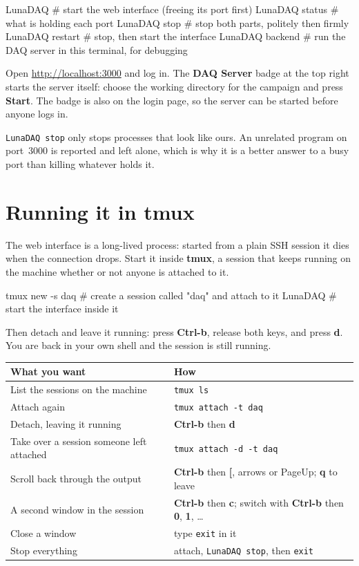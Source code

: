\documentclass[11pt,a4paper]{report}
\newcommand{\cmd}[1]{\texttt{#1}}
\newcommand{\ui}[1]{\textbf{#1}}          %
\begin{document}
\begin{shell}
LunaDAQ            # start the web interface (freeing its port first)
LunaDAQ status     # what is holding each port
LunaDAQ stop       # stop both parts, politely then firmly
LunaDAQ restart    # stop, then start the interface
LunaDAQ backend    # run the DAQ server in this terminal, for debugging
\end{shell}

Open \url{http://localhost:3000} and log in. The \ui{DAQ Server} badge at the top
right starts the server itself: choose the working directory for the campaign and
press \ui{Start}. The badge is also on the login page, so the server can be
started before anyone logs in.

\cmd{LunaDAQ stop} only stops processes that look like ours. An unrelated program
on port~3000 is reported and left alone, which is why it is a better answer to a
busy port than killing whatever holds it.

\section{Running it in tmux}

\label{sec:tmux}
The web interface is a long-lived process: started from a plain SSH session it
dies when the connection drops. Start it inside \textbf{tmux}, a session that
keeps running on the machine whether or not anyone is attached to it.

\begin{shell}
tmux new -s daq        # create a session called "daq" and attach to it
LunaDAQ                # start the interface inside it
\end{shell}

Then detach and leave it running: press \textbf{Ctrl-b}, release both keys, and
press \textbf{d}. You are back in your own shell and the session is still
running.

\begin{center}
\begin{tabular}{@{}L{0.46\textwidth}L{0.46\textwidth}@{}}
\toprule
\textbf{What you want} & \textbf{How} \\
\midrule
List the sessions on the machine & \cmd{tmux ls} \\
Attach again & \cmd{tmux attach -t daq} \\
Detach, leaving it running & \textbf{Ctrl-b} then \textbf{d} \\
Take over a session someone left attached & \cmd{tmux attach -d -t daq} \\
Scroll back through the output & \textbf{Ctrl-b} then \textbf{[}, arrows or PageUp; \textbf{q} to leave \\
A second window in the session & \textbf{Ctrl-b} then \textbf{c}; switch with \textbf{Ctrl-b} then \textbf{0}, \textbf{1}, \dots \\
Close a window & type \cmd{exit} in it \\
Stop everything & attach, \cmd{LunaDAQ stop}, then \cmd{exit} \\
\bottomrule
\end{tabular}
\end{center}
\end{document}
